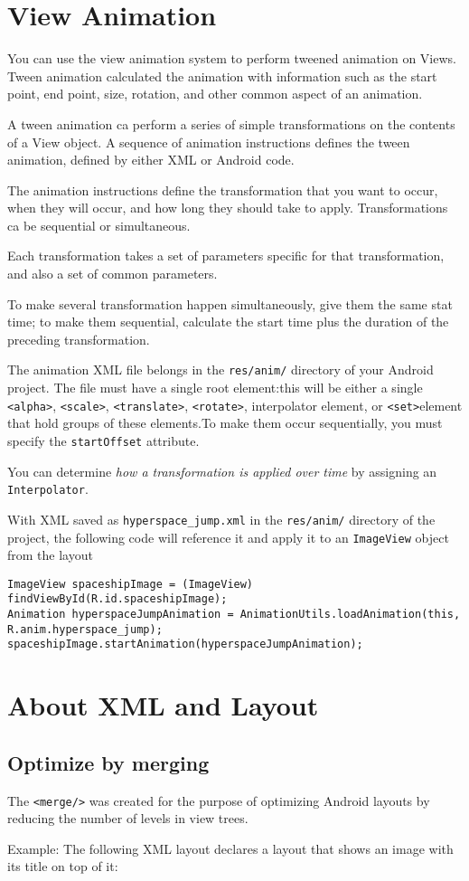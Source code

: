 \documentclass[11pt, a4paper]{book}
\begin{document}
\chapter{View Animation}
You can use the view animation system to perform tweened animation on Views.
Tween animation calculated the animation with information such as the start
point, end point, size, rotation, and other common aspect of an animation.

A tween animation ca perform a series of simple transformations on the contents
of a View object. A sequence of animation instructions defines the tween
animation, defined by either XML or Android code.  

The animation instructions define the transformation that you want to occur,
when they will occur, and how long they should take to apply. Transformations ca
be sequential or simultaneous.

Each transformation takes a set of parameters specific for that transformation,
and also a set of common parameters.

To make several transformation happen simultaneously, give them the same stat
time; to make them sequential, calculate the start time plus the duration of the
preceding transformation.

The animation XML file belongs in the \verb|res/anim/| directory of your Android
project. The file must have a single root element:this will be either a single
\verb|<alpha>|, \verb|<scale>|, \verb|<translate>|, \verb|<rotate>|,
interpolator element, or \verb|<set>|element that hold groups of these
elements.To make them occur sequentially, you must specify the
\verb|startOffset| attribute.

You can determine \emph{how a transformation is applied over time} by assigning
an \verb|Interpolator|.

With XML saved as \verb|hyperspace_jump.xml| in the \verb|res/anim/| directory
of the project, the following code will reference it and apply it to an
\verb|ImageView| object from the layout
\begin{verbatim}
ImageView spaceshipImage = (ImageView) findViewById(R.id.spaceshipImage);
Animation hyperspaceJumpAnimation = AnimationUtils.loadAnimation(this, R.anim.hyperspace_jump);
spaceshipImage.startAnimation(hyperspaceJumpAnimation);
\end{verbatim}
\chapter{About XML and Layout}
\section{Optimize by merging}
The \verb|<merge/>| was created for the purpose of optimizing Android layouts by
reducing the number of levels in view trees. 

Example: The following XML layout declares a layout that shows an image with its
title on top of it:
\begin{verbatim}

\end{verbatim}
\end{document}
